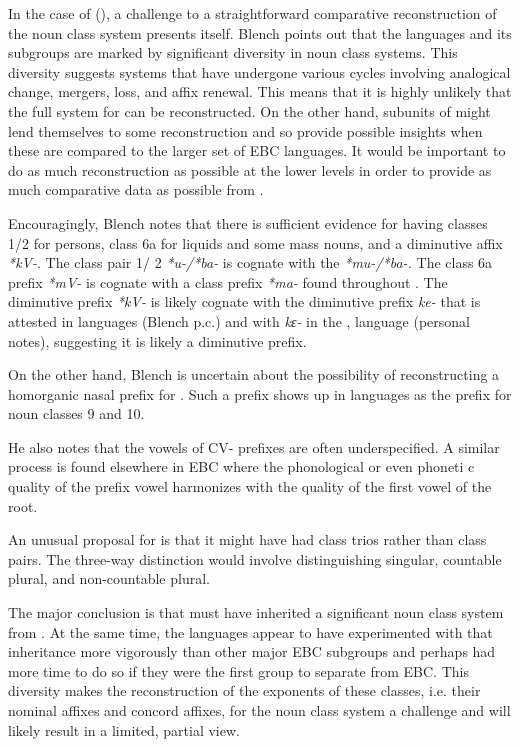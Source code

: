 \documentclass[output=paper]{langsci/langscibook}
\begin{document}
In the case of  (), a challenge to a straightforward comparative reconstruction of the  noun class system presents itself. Blench points out that the  languages and its subgroups are marked by significant diversity in noun class systems. This diversity suggests systems that have undergone various cycles involving analogical change, mergers, loss, and affix renewal. This means that it is highly unlikely that the full system for  can be reconstructed. On the other hand, subunits of  might lend themselves to some reconstruction and so provide possible insights when these are compared to the larger set of EBC languages. It would be important to do as much reconstruction as possible at the lower levels in order to provide as much comparative data as possible from .

Encouragingly, Blench notes that there is sufficient evidence for  having classes 1/2 for persons, class 6a for liquids and some mass nouns, and a diminutive affix \textit{*kV-}. The class pair 1/ 2 \textit{*u-/*ba-} is cognate with the  \textit{*mu-/*ba-.} The class 6a prefix \textit{*mV-} is cognate with a class prefix \textit{*ma-} found throughout . The diminutive prefix \textit{*kV-} is likely cognate with the diminutive prefix \textit{ke-} that is attested in  languages (Blench p.c.) and with \textit{kɛ-} in the ,  language  (personal notes), suggesting it is likely a  diminutive prefix.

On the other hand, Blench is uncertain about the possibility of reconstructing a homorganic nasal prefix for . Such a prefix shows up in  languages as the prefix for noun classes 9 and 10.

He also notes that the vowels of CV- prefixes are often underspecified. A similar process is found elsewhere in EBC where the phonological or even phoneti c quality of the prefix vowel harmonizes with the quality of the first vowel of the root.

An unusual proposal for  is that it might have had class trios rather than class pairs. The three-way distinction would involve distinguishing singular, countable plural, and non-countable plural.

The major conclusion is that  must have inherited a significant noun class system from . At the same time, the  languages appear to have experimented with that inheritance more vigorously than other major EBC subgroups and perhaps had more time to do so if they were the first group to separate from EBC. This diversity makes the reconstruction of the exponents of these classes, i.e. their nominal affixes and concord affixes, for the  noun class system a challenge and will likely result in a limited, partial view.
\end{document}
